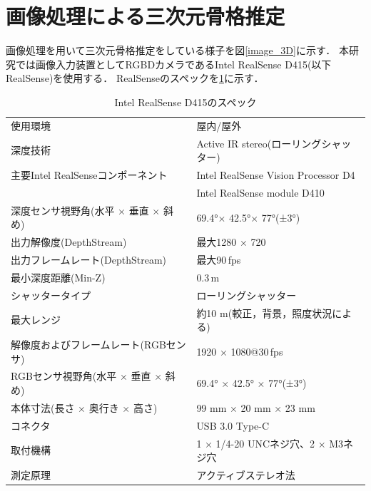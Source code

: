 \documentclass[a4j, fleqn, 12pt]{jsreport}
\begin{document}
\section{画像処理による三次元骨格推定}\label{3Dskeleton}
画像処理を用いて三次元骨格推定をしている様子を図\ref{image_3D}に示す．
本研究では画像入力装置としてRGBDカメラであるIntel RealSense D415(以下RealSense)を使用する．
RealSenseのスペックを\ref{D415}に示す．
\begin{table}[t]
  \centering
  \caption{Intel RealSense D415のスペック}
  \begin{tabular}{l|l}
    \hline
    {\small 使用環境}                                  & {\small 屋内/屋外}                                     \\
    {\small 深度技術}                                  & {\small Active IR stereo(ローリングシャッター)}              \\
    {\small 主要Intel RealSenseコンポーネント}              & {\small Intel RealSense Vision Processor D4}       \\
                                                   & {\small Intel RealSense module D410}               \\
    {\small 深度センサ視野角(水平 $\times$ 垂直 $\times$ 斜め)}  & {\small 69.4°$\times$ 42.5°$\times$ 77°(±3°)}      \\
    {\small 出力解像度(DepthStream)}                    & {\small 最大1280 $\times$ 720}                       \\
    {\small 出力フレームレート(DepthStream) }               & {\small 最大90\,fps}                                 \\
    {\small 最小深度距離(Min-Z)}                         & {\small 0.3\,m}                                    \\
    {\small シャッタータイプ}                              & {\small ローリングシャッター}                                \\
    {\small 最大レンジ}                                 & {\small 約10 m(較正，背景，照度状況による)}                      \\
    {\small 解像度およびフレームレート(RGBセンサ)}                 & {\small 1920 $\times$ 1080@30\,fps }               \\
    {\small RGBセンサ視野角(水平 $\times$ 垂直 $\times$ 斜め)} & {\small 69.4° $\times$ 42.5° $\times$ 77°(±3°)}    \\
    {\small 本体寸法(長さ $\times$ 奥行き $\times$ 高さ)}     & {\small 99 mm $\times$ 20 mm $\times$ 23 mm}       \\
    {\small コネクタ}                                  & {\small USB 3.0 Type-C}                            \\
    {\small 取付機構}                                  & {\small 1 $\times$ 1/4-20 UNCネジ穴、2 $\times$ M3ネジ穴} \\
    {\small 測定原理}                                  & {\small アクティブステレオ法}                                \\\hline%
  \end{tabular}
  \label{D415}
\end{table}
\end{document}
